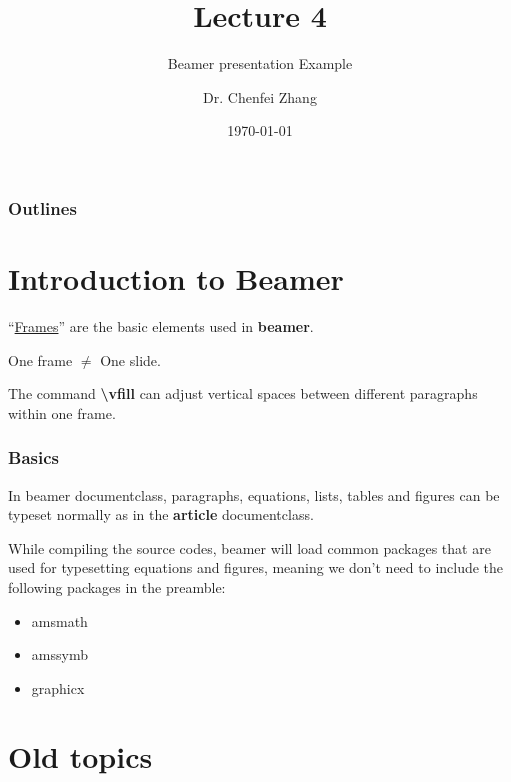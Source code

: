 \documentclass{beamer}
\title{Lecture 4}
\subtitle{Beamer presentation Example}
\author{Dr. Chenfei Zhang}
\date{\today}
\institute{UNNC}
\begin{document}
\begin{frame}
\maketitle
\end{frame}
\begin{frame}
\frametitle{Outlines}
\tableofcontents
\end{frame}

\section{Introduction to Beamer}
\begin{frame}
``\underline{Frames}'' are the basic elements used in \textbf{beamer}.\\
\vfill

\pause %

One frame $\ne$ One slide.\\

\pause

\vfill
The command \textbf{\textbackslash vfill} can adjust vertical spaces between different paragraphs within one frame.
\end{frame}
\begin{frame}
\frametitle{Basics}
In beamer documentclass, paragraphs, equations, lists, tables and figures can be typeset normally as in the \textbf{article} documentclass.\\[2ex]

\pause

While compiling the source codes, beamer will load common packages that are used for typesetting equations and figures, meaning we don't need to include the following packages in the preamble:
\begin{itemize}
\item
amsmath
\item
amssymb
\item
graphicx
\end{itemize}

\end{frame}
\section{Old topics}
\end{document}
